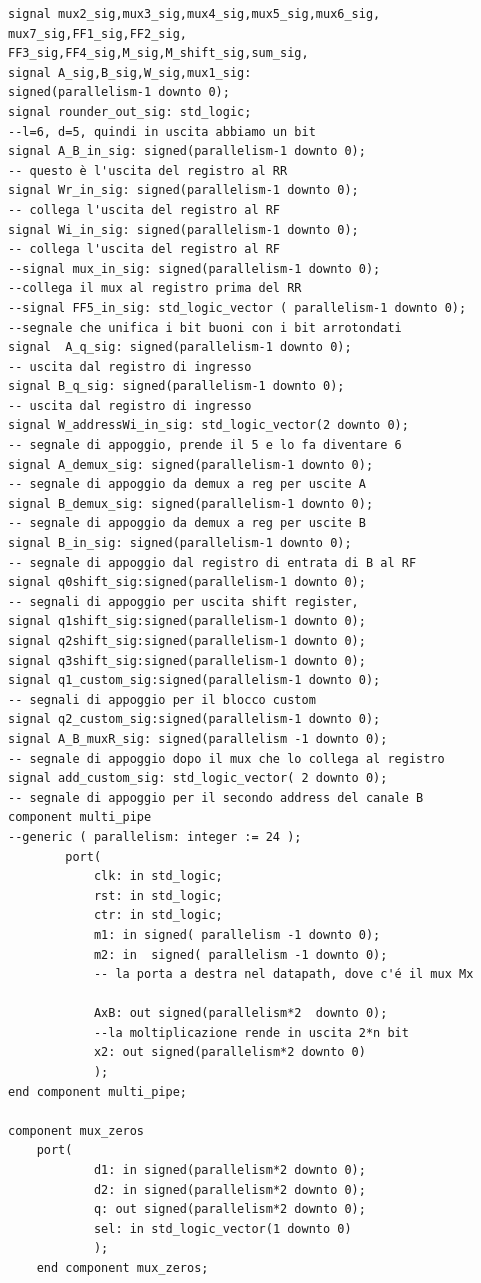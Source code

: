 \documentclass[a4paper, titlepage]{article}
\begin{document}
\begin{description}
\begin{verbatim}
signal mux2_sig,mux3_sig,mux4_sig,mux5_sig,mux6_sig,
mux7_sig,FF1_sig,FF2_sig,
FF3_sig,FF4_sig,M_sig,M_shift_sig,sum_sig,
signal A_sig,B_sig,W_sig,mux1_sig: 
signed(parallelism-1 downto 0);
signal rounder_out_sig: std_logic;
--l=6, d=5, quindi in uscita abbiamo un bit
signal A_B_in_sig: signed(parallelism-1 downto 0); 
-- questo è l'uscita del registro al RR
signal Wr_in_sig: signed(parallelism-1 downto 0);
-- collega l'uscita del registro al RF
signal Wi_in_sig: signed(parallelism-1 downto 0); 
-- collega l'uscita del registro al RF 
--signal mux_in_sig: signed(parallelism-1 downto 0); 
--collega il mux al registro prima del RR
--signal FF5_in_sig: std_logic_vector ( parallelism-1 downto 0);
--segnale che unifica i bit buoni con i bit arrotondati
signal  A_q_sig: signed(parallelism-1 downto 0); 
-- uscita dal registro di ingresso
signal B_q_sig: signed(parallelism-1 downto 0); 
-- uscita dal registro di ingresso
signal W_addressWi_in_sig: std_logic_vector(2 downto 0); 
-- segnale di appoggio, prende il 5 e lo fa diventare 6
signal A_demux_sig: signed(parallelism-1 downto 0); 
-- segnale di appoggio da demux a reg per uscite A
signal B_demux_sig: signed(parallelism-1 downto 0); 
-- segnale di appoggio da demux a reg per uscite B
signal B_in_sig: signed(parallelism-1 downto 0); 
-- segnale di appoggio dal registro di entrata di B al RF 
signal q0shift_sig:signed(parallelism-1 downto 0); 
-- segnali di appoggio per uscita shift register, 
signal q1shift_sig:signed(parallelism-1 downto 0);
signal q2shift_sig:signed(parallelism-1 downto 0);
signal q3shift_sig:signed(parallelism-1 downto 0);
signal q1_custom_sig:signed(parallelism-1 downto 0);
-- segnali di appoggio per il blocco custom
signal q2_custom_sig:signed(parallelism-1 downto 0);
signal A_B_muxR_sig: signed(parallelism -1 downto 0);
-- segnale di appoggio dopo il mux che lo collega al registro
signal add_custom_sig: std_logic_vector( 2 downto 0); 
-- segnale di appoggio per il secondo address del canale B
component multi_pipe 
--generic ( parallelism: integer := 24 );
		port(
			clk: in std_logic;
			rst: in std_logic;
			ctr: in std_logic;
			m1: in signed( parallelism -1 downto 0);
			m2: in  signed( parallelism -1 downto 0); 
			-- la porta a destra nel datapath, dove c'é il mux Mx
			
			AxB: out signed(parallelism*2  downto 0); 
			--la moltiplicazione rende in uscita 2*n bit
			x2: out signed(parallelism*2 downto 0)
			);
end component multi_pipe;

component mux_zeros
	port(
			d1: in signed(parallelism*2 downto 0);
			d2: in signed(parallelism*2 downto 0);
			q: out signed(parallelism*2 downto 0);
			sel: in std_logic_vector(1 downto 0)
			);	
	end component mux_zeros;	


\end{verbatim}
\end{description}
\end{document}
